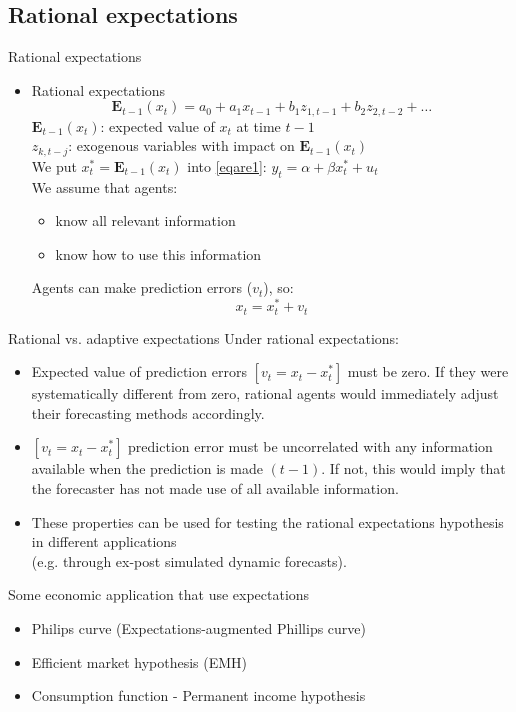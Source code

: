 \documentclass{beamer}
\begin{document}
\subsection{Rational expectations}
\begin{frame}{Rational expectations}
\begin{itemize}
\item Rational expectations
$$\mathbf{E}_{t-1}(x_t)=a_0+a_1 x_{t-1} + b_1 z_{1,t-1}+b_2 z_{2, t-2}+\dots$$
$\mathbf{E}_{t-1}(x_t)$: expected value of $x_t$ at time $t-1$\\
$z_{k,t-j}$: exogenous variables with impact on $\mathbf{E}_{t-1}(x_t)$\\
\vspace{0.3cm}
We put $x_t^\ast = \mathbf{E}_{t-1}(x_t)$ into \eqref{eqare1}: $y_t = \alpha + \beta x_t^\ast + u_t$\\
\vspace{0.3cm}
We assume that agents:
\begin{itemize}
\item know all relevant information
\item know how to use this information
\end{itemize}
\vspace{0.3cm}
Agents can make prediction errors ($v_t$), so: $$x_t=x^\ast_t+v_t $$
\end{itemize}
\end{frame}
\begin{frame}{Rational vs. adaptive expectations}
Under rational expectations:
\vspace{0.3cm}
\begin{itemize}
\item Expected value of  prediction errors $[v_t = x_t - x^\ast_t]$ must be zero. If they were systematically different from zero, rational agents would immediately adjust their forecasting methods accordingly.
\vspace{0.3cm}
\item $[v_t = x_t - x^\ast_t]$ prediction error must be uncorrelated with any information available when the prediction is made $(t-1)$. If not, this would imply that the forecaster has not made use of all available information.
\vspace{0.3cm}
\item These properties can be used for testing the rational expectations hypothesis in different applications \\(e.g. through ex-post simulated dynamic forecasts).
\end{itemize}
\end{frame}
\begin{frame}{Some economic application that use expectations}
\begin{itemize}
\item Philips curve (Expectations-augmented Phillips curve)
\item Efficient market hypothesis (EMH)
\item Consumption function - Permanent income hypothesis
\end{itemize}
\end{frame}
\end{document}
